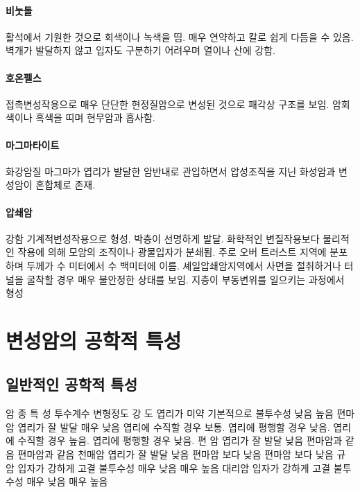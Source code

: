 \documentclass[12pt, a4paper, twoside]{book}
\begin{document}
			\paragraph{비눗돌}
						활석에서 기원한 것으로 회색이나 녹색을 띰. 
						매우 연약하고 칼로 쉽게 다듬을 수 있음. 
						벽개가 발달하지 않고 입자도 구분하기 어려우며 열이나 산에 강함.
			\paragraph{호온펠스}
						접촉변성작용으로 매우 단단한 현정질암으로 변성된 것으로 패각상 구조를 보임. 
						암회색이나 흑색을 띠며 현무암과 흡사함. 
			\paragraph{마그마타이트}
						화강암질 마그마가 엽리가 발달한 암반내로 관입하면서 압성조직을 지닌 화성암과 변성암이 혼합체로 존재.
			\paragraph{압쇄암}
						강함 기계적변성작용으로 형성. 
						박층이 선명하게 발달. 
						화학적인 변질작용보다 물리적인 작용에 의해 모암의 조직이나 광물입자가 분쇄됨. 
						주로 오버 트러스트 지역에 분포하며 두께가 수 미터에서 수 백미터에 이름. 
						셰일압쇄암지역에서 사면을 절취하거나 터널을 굴착할 경우 매우 불안정한 상태를 보임. 
						지층이 부동변위를 일으키는 과정에서 형성



	\clearpage
	\section{변성암의 공학적 특성}
		

		\subsection{일반적인 공학적 특성}

암  종		특  성			투수계수				변형정도										강  도
			엽리가 미약		기본적으로 불투수성		낮음											높음
편마암		엽리가 잘 발달		매우 낮음				엽리에 수직할 경우 보통. 엽리에 평행할 경우 낮음.		엽리에 수직할 경우 높음. 엽리에 평행할 경우 낮음.
편  암		엽리가 잘 발달		낮음					편마암과 같음									편마암과 같음
천매암		엽리가 잘 발달		낮음					편마암 보다 낮음								편마암 보다 낮음
규  암		입자가 강하게 고결	불투수성				매우 낮음										매우 높음
대리암		입자가 강하게 고결	불투수성				매우 낮음										매우 높음
\end{document}

